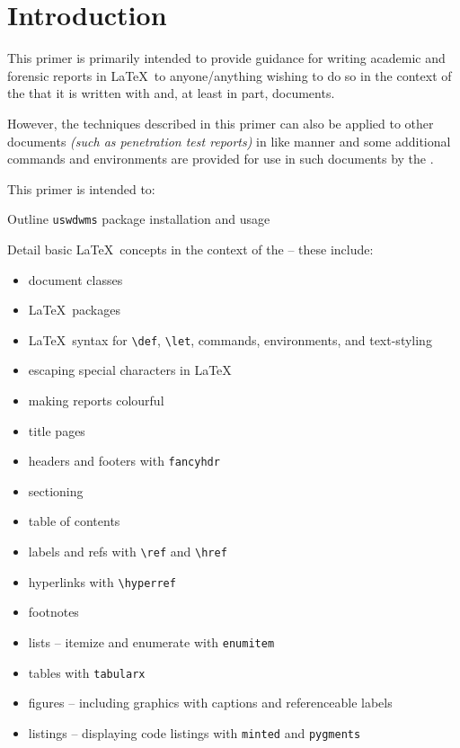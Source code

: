 \section{Introduction}
This primer is primarily intended to provide guidance for writing academic and forensic reports in \LaTeX\ to anyone/anything wishing to do so in the context of the \uswdwmspkg{} that it is written with and, at least in part, documents.

However, the techniques described in this primer can also be applied to other documents \textit{(such as penetration test reports)} in like manner and some additional commands and environments are provided for use in such documents by the \uswdwmspkg{}.

This primer is intended to:
\begin{methodology0}
  \item Outline \texttt{uswdwms} package installation and usage
  \item Detail basic \LaTeX\ concepts in the context of the \uswdwmspkg{} -- these include:
    \begin{itemize}
      \item document classes
      \item \LaTeX\ packages
      \item \LaTeX\ syntax for \texttt{\textbackslash def}, \texttt{\textbackslash let}, commands, environments, and text-styling
      \item escaping special characters in \LaTeX\
      \item making reports colourful
      \item title pages
      \item headers and footers with \texttt{fancyhdr}
      \item sectioning
      \item table of contents
      \item labels and refs with \texttt{\textbackslash ref} and \texttt{\textbackslash href}
      \item hyperlinks with \texttt{\textbackslash hyperref}
      \item footnotes
      \item lists -- itemize and enumerate with \texttt{enumitem}
      \item tables with \texttt{tabularx}
      \item figures -- including graphics with captions and referenceable labels
      \item listings -- displaying code listings with \texttt{minted} and \texttt{pygments}

\end{itemize}
\end{methodology0}
